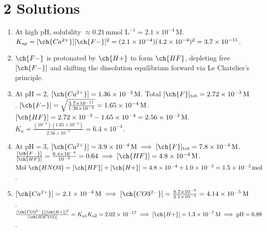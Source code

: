 \documentclass[11pt]{article}
\begin{document}
\section{2 Solutions}
\begin{enumerate}[label=\alph*.]
    \item At high pH, solubility $\approx 0.21\,\text{mmol L}^{-1} = 2.1\times10^{-4}\,\text{M}$.
    $K_{sp} = [\ch{Ca^{2+}}][\ch{F-}]^2 = (2.1\times10^{-4})(4.2\times10^{-4})^2 = 3.7\times10^{-11}$.
    \item $\ch{F-}$ is protonated by $\ch{H+}$ to form $\ch{HF}$, depleting free $[\ch{F-}]$ and shifting the dissolution equilibrium forward via Le Chatelier's principle.
    \item At $\text{pH}=2$, $[\ch{Ca^{2+}}] = 1.36\times10^{-3}\,\text{M}$. Total $[\ch{F}]_{\text{tot}} = 2.72\times10^{-3}\,\text{M}$.
    $[\ch{F-}] = \sqrt{\frac{3.7\times10^{-11}}{1.36\times10^{-3}}} = 1.65\times10^{-4}\,\text{M}$.
    $[\ch{HF}] = 2.72\times10^{-3} - 1.65\times10^{-4} = 2.56\times10^{-3}\,\text{M}$.
    $K_a = \frac{(10^{-2})(1.65\times10^{-4})}{2.56\times10^{-3}} = 6.4\times10^{-4}$.
    \item At $\text{pH}=3$, $[\ch{Ca^{2+}}] = 3.9\times10^{-4}\,\text{M} \implies [\ch{F}]_{\text{tot}} = 7.8\times10^{-4}\,\text{M}$.
    $\frac{[\ch{F-}]}{[\ch{HF}]} = \frac{6.4\times10^{-4}}{10^{-3}} = 0.64 \implies [\ch{HF}] = 4.8\times10^{-4}\,\text{M}$.
    $\text{Mol }\ch{HNO3} = [\ch{HF}] + [\ch{H+}] = 4.8\times10^{-4} + 1.0\times10^{-3} = 1.5\times10^{-3}\,\text{mol}$.
    \item $[\ch{Ca^{2+}}] = 2.1\times10^{-4}\,\text{M} \implies [\ch{CO3^{2-}}] = \frac{8.7\times10^{-9}}{2.1\times10^{-4}} = 4.14\times10^{-5}\,\text{M}$.
    $\frac{[\ch{CO3^{2-}}][\ch{H+}]^2}{[\ch{H2CO3}]} = K_{a1}K_{a2} = 2.02\times10^{-17} \implies [\ch{H+}] = 1.3\times10^{-7}\,\text{M} \implies \text{pH} = 6.88$.
\end{enumerate}
\end{document}
